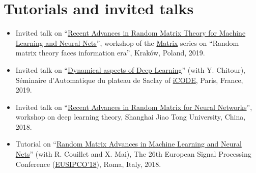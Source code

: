 \documentclass[a4paper,10pt]{article}
\begin{document}
\section{Tutorials and invited talks}
\begin{itemize}\parskip=0cm
  \item Invited talk on ``\href{https://zhenyu-liao.github.io/pdf/talk_liao_handout.pdf}{Recent Advances in Random Matrix Theory for Machine Learning and Neural Nets}'', workshop of the \href{http://cs.if.uj.edu.pl/matrix/}{Matrix} series  on ``Random matrix theory faces information era'', Kraków, Poland, 2019.
  \item Invited talk on ``\href{https://zhenyu-liao.github.io/pdf/GDD_iCODE.pdf}{Dynamical aspects of Deep Learning}'' (with Y. Chitour), S{\'e}minaire d'Automatique du plateau de Saclay of \href{https://icode-seminars.github.io}{iCODE}, Paris, France, 2019.
  \item Invited talk on ``\href{https://zhenyu-liao.github.io/pdf/liao_SJTU_handout.pdf}{Recent Advances in Random Matrix for Neural Networks}'', workshop on deep learning theory, Shanghai Jiao Tong University, China, 2018.
  \item Tutorial on ``\href{https://zhenyu-liao.github.io/pdf/tutorial_Eusipco_handout.pdf}{Random Matrix Advances in Machine Learning and Neural Nets}'' (with R. Couillet and X. Mai), The 26th European Signal Processing Conference (\href{http://www.eusipco2018.org/tutorials.php}{EUSIPCO'18}), Roma, Italy, 2018.
\end{itemize}
%
%
%
%
%


\end{document}
